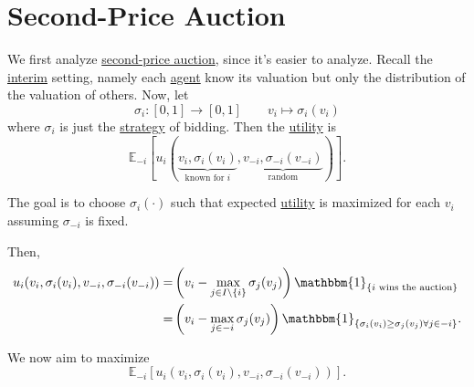 \section{Second-Price Auction}
We first analyze \hyperref[eg:second-price-auction]{second-price auction}, since it's easier to analyze. Recall the \hyperref[def:interim]{interim} setting,
namely each \hyperref[def:player]{agent} know its valuation but only the distribution of the valuation of others. Now, let
\[
	\sigma_{i}\colon [0, 1]\to [0, 1]\qquad v_{i}\mapsto  \sigma_{i}(v_{i})
\]
where \(\sigma_{i}\) is just the \hyperref[def:strategy]{strategy} of bidding. Then the \hyperref[def:reward]{utility} is
\[
	\mathbb{E}_{-i}\left[u_{i}(\underbrace{v_{i}, \sigma_{i}(v_{i})}_{\text{known for \(i\)}}, \underbrace{v_{-i}, \sigma_{-i}(v_{-i})}_{\text{random}}) \right] .
\]

The goal is to choose \(\sigma_{i}(\cdot)\) such that expected \hyperref[def:reward]{utility} is maximized for each \(v_{i}\)
assuming \(\sigma_{-i}\) is fixed.

Then,
\[
	\begin{split}
		u_{i}(v_{i}, \sigma_{i}(v_{i}), v_{-i}, \sigma_{-i}(v_{-i}))
		=&\left(v_{i} - \max_{j\in I\setminus\{i\}}\sigma_{j}(v_{j})\right)\mathbbm{1}_{\{\text{\(i\) wins the auction}\}}\\
		=&\left(v_{i} - \max_{j\in -i}\sigma_{j}(v_{j})\right)\mathbbm{1}_{\{ \sigma_{i}(v_{i})\geq \sigma_{j}(v_{j}) \forall j\in -i \}}.
	\end{split}
\]

We now aim to maximize
\[
	\mathbb{E}_{-i}\left[u_{i}(v_{i}, \sigma_{i}(v_{i}), v_{-i}, \sigma_{-i}(v_{-i})) \right] .
\]

